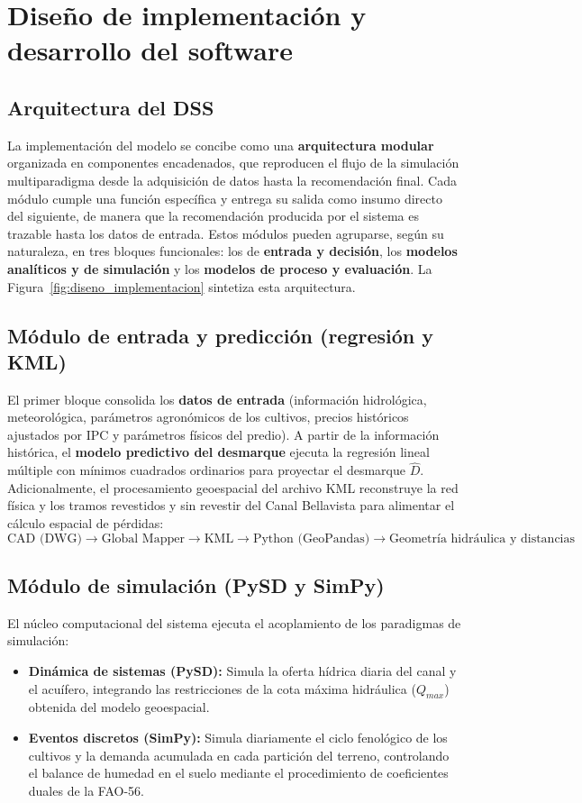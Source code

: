 \documentclass[12pt]{report}
\begin{document}
\chapter{Diseño de implementación y desarrollo del software}

\section{Arquitectura del DSS}

La implementación del modelo se concibe como una \textbf{arquitectura modular} organizada en componentes encadenados, que reproducen el flujo de la simulación multiparadigma desde la adquisición de datos hasta la recomendación final. Cada módulo cumple una función específica y entrega su salida como insumo directo del siguiente, de manera que la recomendación producida por el sistema es trazable hasta los datos de entrada. Estos módulos pueden agruparse, según su naturaleza, en tres bloques funcionales: los de \textbf{entrada y decisión}, los \textbf{modelos analíticos y de simulación} y los \textbf{modelos de proceso y evaluación}. La Figura~\ref{fig:diseno_implementacion} sintetiza esta arquitectura.

\section{Módulo de entrada y predicción (regresión y KML)}

El primer bloque consolida los \textbf{datos de entrada} (información hidrológica, meteorológica, parámetros agronómicos de los cultivos, precios históricos ajustados por IPC y parámetros físicos del predio). A partir de la información histórica, el \textbf{modelo predictivo del desmarque} ejecuta la regresión lineal múltiple con mínimos cuadrados ordinarios para proyectar el desmarque $\hat{D}$. Adicionalmente, el procesamiento geoespacial del archivo KML reconstruye la red física y los tramos revestidos y sin revestir del Canal Bellavista para alimentar el cálculo espacial de pérdidas:
$$\text{CAD (DWG)} \to \text{Global Mapper} \to \text{KML} \to \text{Python (GeoPandas)} \to \text{Geometría hidráulica y distancias}$$

\section{Módulo de simulación (PySD y SimPy)}

El núcleo computacional del sistema ejecuta el acoplamiento de los paradigmas de simulación:
\begin{itemize}
    \item \textbf{Dinámica de sistemas (PySD):} Simula la oferta hídrica diaria del canal y el acuífero, integrando las restricciones de la cota máxima hidráulica ($Q_{max}$) obtenida del modelo geoespacial.
    \item \textbf{Eventos discretos (SimPy):} Simula diariamente el ciclo fenológico de los cultivos y la demanda acumulada en cada partición del terreno, controlando el balance de humedad en el suelo mediante el procedimiento de coeficientes duales de la FAO-56.
\end{itemize}
\end{document}
